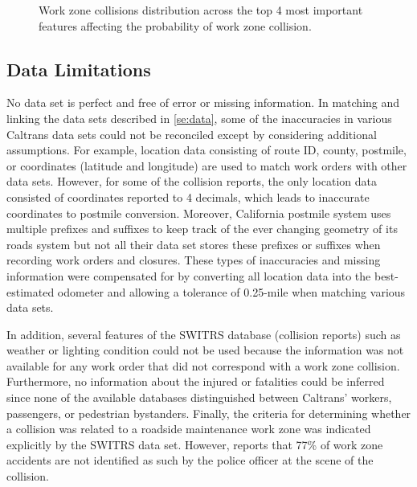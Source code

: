 \documentclass[10pt,a4paper]{article}
\begin{document}
\begin{figure}[hb!]
	\qquad\qquad
	\caption{Work zone collisions distribution across the top 4 most important features affecting the probability of work zone collision.}
	\label{fig:feature.effect}
\end{figure}

\subsection{Data Limitations}
No data set is perfect and free of error or missing information. In matching and linking the data sets described in \ref{se:data}, some of the inaccuracies in various Caltrans data sets could not be reconciled except by considering additional assumptions. For example, location data consisting of route ID, county, postmile, or coordinates (latitude and longitude) are used to match work orders with other data sets. However, for some of the collision reports, the only location data consisted of coordinates reported to 4 decimals, which leads to inaccurate coordinates to postmile conversion. Moreover, California postmile system uses multiple prefixes and suffixes to keep track of the ever changing geometry of its roads system but not all their data set stores these prefixes or suffixes when recording work orders and closures. These types of inaccuracies and missing information were compensated for by converting all location data into the best-estimated odometer and allowing a tolerance of 0.25-mile when matching various data sets.

In addition, several features of the SWITRS database (collision reports) such as weather or lighting condition could not be used because the information was not available for any work order that did not correspond with a work zone collision. Furthermore, no information about the injured or fatalities could be inferred since none of the available databases distinguished between Caltrans' workers, passengers, or pedestrian bystanders. Finally, the criteria for determining whether a collision was related to a roadside maintenance work zone was indicated explicitly by the SWITRS data set. However, \cite{fha2018} reports that 77\% of work zone accidents are not identified as such by the police officer at the scene of the collision. 
\end{document}
